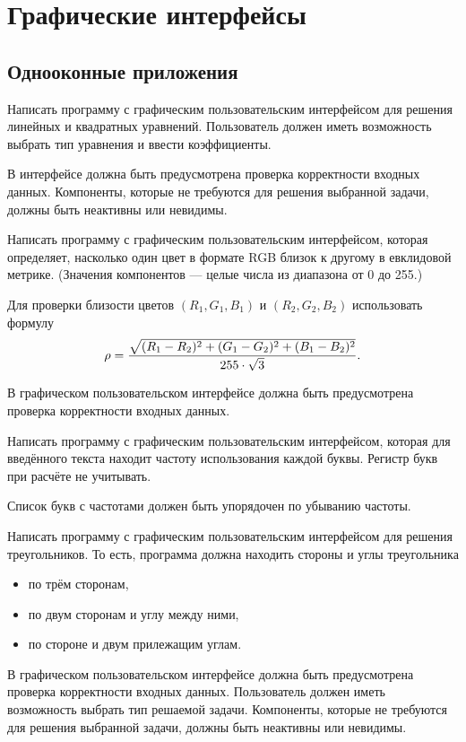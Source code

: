 \section{Графические интерфейсы}

\subsection{Однооконные приложения}

\task Написать программу с графическим пользовательским интерфейсом
для решения линейных и квадратных уравнений. Пользователь должен иметь
возможность выбрать тип уравнения и ввести коэффициенты.

В интерфейсе должна быть предусмотрена проверка корректности входных
данных. Компоненты, которые не требуются для решения выбранной задачи,
должны быть неактивны или невидимы.

\task Написать программу с графическим пользовательским интерфейсом,
которая определяет, насколько один цвет в формате RGB близок к другому
в евклидовой метрике. (Значения компонентов — целые числа из диапазона
от 0 до 255.)

Для проверки близости цветов $(R_1, G_1, B_1)$ и $(R_2, G_2, B_2)$
использовать формулу
\[
\rho = {\sqrt{(R_1-R_2)^2 + (G_1-G_2)^2 + (B_1-B_2)^2} \over 255 \cdot \sqrt{3}}.
\]

В графическом пользовательском интерфейсе должна быть предусмотрена
проверка корректности входных данных.

\task Написать программу с графическим пользовательским интерфейсом,
которая для введённого текста находит частоту использования каждой
буквы. Регистр букв при расчёте не учитывать.

Список букв с частотами должен быть упорядочен по убыванию частоты.

\task Написать программу с графическим пользовательским интерфейсом
для решения треугольников. То есть, программа должна находить стороны
и углы треугольника
\begin{itemize}
\item по трём сторонам,
\item по двум сторонам и углу между ними,
\item по стороне и двум прилежащим углам.
\end{itemize}

В графическом пользовательском интерфейсе должна быть предусмотрена
проверка корректности входных данных. Пользователь должен иметь
возможность выбрать тип решаемой задачи. Компоненты, которые не
требуются для решения выбранной задачи, должны быть неактивны или
невидимы.

